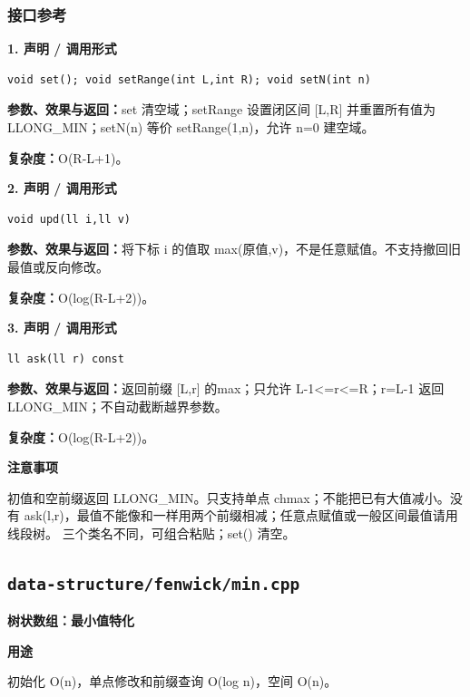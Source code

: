 \documentclass[UTF8,a4paper,10pt]{ctexart}
\newcommand{\TemplUsage}[1]{\textbf{用途}\par #1\par}
\newcommand{\TemplNote}[1]{\textbf{注意事项}\par #1\par}
\begin{document}
\subsubsection*{接口参考}
\noindent\begin{minipage}{\textwidth}
\textbf{1. 声明 / 调用形式}
\begin{lstlisting}
void set(); void setRange(int L,int R); void setN(int n)
\end{lstlisting}
\textbf{参数、效果与返回：}set 清空域；setRange 设置闭区间 [L,R] 并重置所有值为 LLONG\_MIN；setN(n) 等价 setRange(1,n)，允许 n=0 建空域。

\textbf{复杂度：}O(R-L+1)。

\end{minipage}\par\vspace{0.4em}
\noindent\begin{minipage}{\textwidth}
\textbf{2. 声明 / 调用形式}
\begin{lstlisting}
void upd(ll i,ll v)
\end{lstlisting}
\textbf{参数、效果与返回：}将下标 i 的值取 max(原值,v)，不是任意赋值。不支持撤回旧最值或反向修改。

\textbf{复杂度：}O(log(R-L+2))。

\end{minipage}\par\vspace{0.4em}
\noindent\begin{minipage}{\textwidth}
\textbf{3. 声明 / 调用形式}
\begin{lstlisting}
ll ask(ll r) const
\end{lstlisting}
\textbf{参数、效果与返回：}返回前缀 [L,r] 的max；只允许 L-1<=r<=R；r=L-1 返回 LLONG\_MIN；不自动截断越界参数。

\textbf{复杂度：}O(log(R-L+2))。

\TemplNote{初值和空前缀返回 LLONG\_MIN。只支持单点 chmax；不能把已有大值减小。没有 ask(l,r)，最值不能像和一样用两个前缀相减；任意点赋值或一般区间最值请用线段树。 三个类名不同，可组合粘贴；set() 清空。}
\end{minipage}\par\vspace{0.4em}
\clearpage
\subsection{\texttt{data-structure/fenwick/min.cpp}}
\textbf{树状数组：最小值特化}\par
\TemplUsage{初始化 O(n)，单点修改和前缀查询 O(log n)，空间 O(n)。}
\end{document}
